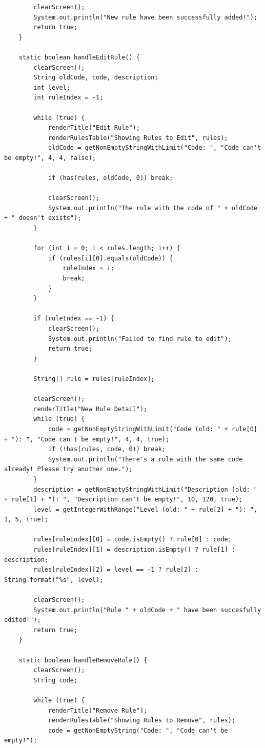 \documentclass[12pt,titlepage]{article}
\begin{document}
\begin{verbatim}
        clearScreen();
        System.out.println("New rule have been successfully added!");
        return true;
    }

    static boolean handleEditRule() {
        clearScreen();
        String oldCode, code, description;
        int level;
        int ruleIndex = -1;

        while (true) {
            renderTitle("Edit Rule");
            renderRulesTable("Showing Rules to Edit", rules);
            oldCode = getNonEmptyStringWithLimit("Code: ", "Code can't be empty!", 4, 4, false);

            if (has(rules, oldCode, 0)) break;

            clearScreen();
            System.out.println("The rule with the code of " + oldCode + " doesn't exists");
        }

        for (int i = 0; i < rules.length; i++) {
            if (rules[i][0].equals(oldCode)) {
                ruleIndex = i;
                break;
            }
        }

        if (ruleIndex == -1) {
            clearScreen();
            System.out.println("Failed to find rule to edit");
            return true;
        }

        String[] rule = rules[ruleIndex];

        clearScreen();
        renderTitle("New Rule Detail");
        while (true) {
            code = getNonEmptyStringWithLimit("Code (old: " + rule[0] + "): ", "Code can't be empty!", 4, 4, true);
            if (!has(rules, code, 0)) break;
            System.out.println("There's a rule with the same code already! Please try another one.");
        }
        description = getNonEmptyStringWithLimit("Description (old: " + rule[1] + "): ", "Description can't be empty!", 10, 120, true);
        level = getIntegerWithRange("Level (old: " + rule[2] + "): ", 1, 5, true);

        rules[ruleIndex][0] = code.isEmpty() ? rule[0] : code;
        rules[ruleIndex][1] = description.isEmpty() ? rule[1] : description;
        rules[ruleIndex][2] = level == -1 ? rule[2] : String.format("%s", level);

        clearScreen();
        System.out.println("Rule " + oldCode + " have been succesfully edited!");
        return true;
    }

    static boolean handleRemoveRule() {
        clearScreen();
        String code;

        while (true) {
            renderTitle("Remove Rule");
            renderRulesTable("Showing Rules to Remove", rules);
            code = getNonEmptyString("Code: ", "Code can't be empty!");


\end{verbatim}
\end{document}
